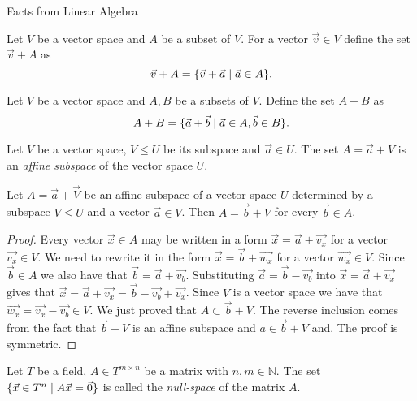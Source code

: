 \begin{chapter}{Facts from Linear Algebra}
\label{appendix-linear-algebra}
\begin{definition}
Let $V$ be a vector space and $A$ be a subset of $V$. For a vector $\vec{v} \in V$ define the set $\vec{v} + A$ as
\[ \vec{v} + A = \{ \vec{v} + \vec{a} \mid \vec{a} \in A \} \text{.} \] 
\end{definition}

\begin{definition}
Let $V$ be a vector space and $A, B$ be a subsets of $V$. Define the set $A + B$ as
\[ A + B = \{ \vec{a} + \vec{b} \mid \vec{a} \in A, \vec{b} \in B \} \text{.} \] 
\end{definition}

\begin{definition}
\label{definition-affine-subspace}
Let $V$ be a vector space, $V \leq U$ be its subspace and $\vec{a} \in U$. The set $A = \vec{a} + V$ is an \emph{affine subspace} of the vector space $U$.
\end{definition}

\begin{lemma}
\label{lemma-affine-subspace-equality}
Let $A = \vec{a} + \vec{V}$ be an affine subspace of a vector space $U$ determined by a subspace $V \leq U$ and a vector $\vec{a} \in V$. Then $A = \vec{b} + V$ for every $\vec{b} \in A$.
\end{lemma}
\begin{proof}
Every vector $\vec{x} \in A$ may be written in a form $\vec{x} = \vec{a} + \vec{v_x}$ for a vector $\vec{v_x} \in V$. We need to rewrite it in the form $\vec{x} = \vec{b} + \vec{w_x}$ for a vector $\vec{w_x} \in V$. Since $\vec{b} \in A$ we also have that $\vec{b} = \vec{a} + \vec{v_b}$. Substituting $\vec{a} = \vec{b} - \vec{v_b}$ into $\vec{x} = \vec{a} + \vec{v_x}$ gives that $\vec{x} = \vec{a} + \vec{v_x} = \vec{b} - \vec{v_b} + \vec{v_x}$. Since $V$ is a vector space we have that $\vec{w_x} = \vec{v_x} - \vec{v_b} \in V$. We just proved that $A \subset \vec{b} + V$. The reverse inclusion comes from the fact that $\vec{b} + V$ is an affine subspace and $a \in \vec{b} + V$ and. The proof is symmetric.
\end{proof}

\begin{definition}
Let $T$ be a field, $A \in T ^ {m \times n}$ be a matrix with $n, m \in \mathbb{N}$. The set $\{ \vec{x} \in T^{n} \mid A\vec{x} = \vec{0} \}$ is called the \emph{null-space} of the matrix $A$.
\end{definition}


\end{chapter}
